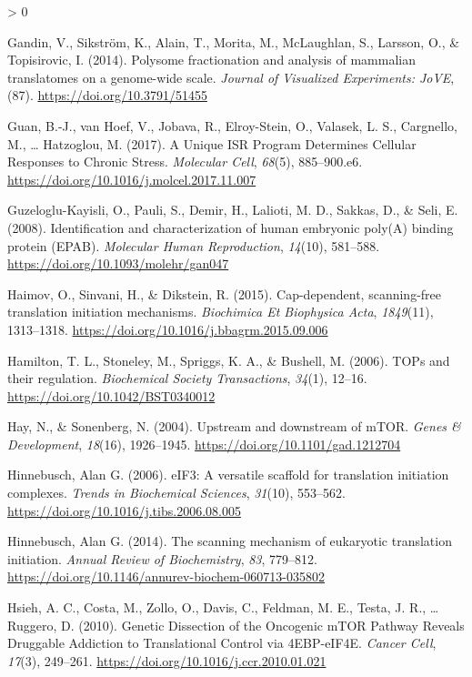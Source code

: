 \documentclass[
  12pt,
  openany]{book}
\newlength{\cslhangindent}
\newenvironment{CSLReferences}[2] %
 {%
  \setlength{\parindent}{0pt}
  \ifodd #1 \everypar{\setlength{\hangindent}{\cslhangindent}}\ignorespaces\fi
  \ifnum #2 > 0
  \setlength{\parskip}{#2\baselineskip}
  \fi
 }%
 {}
\begin{document}
\begin{CSLReferences}{1}{0}
\leavevmode\hypertarget{ref-Gandin2014}{}%
Gandin, V., Sikström, K., Alain, T., Morita, M., McLaughlan, S., Larsson, O., \& Topisirovic, I. (2014). Polysome fractionation and analysis of mammalian translatomes on a genome-wide scale. \emph{Journal of Visualized Experiments: JoVE}, (87). \url{https://doi.org/10.3791/51455}

\leavevmode\hypertarget{ref-Guan2017}{}%
Guan, B.-J., van Hoef, V., Jobava, R., Elroy-Stein, O., Valasek, L. S., Cargnello, M., \ldots{} Hatzoglou, M. (2017). A {Unique ISR Program Determines Cellular Responses} to {Chronic Stress}. \emph{Molecular Cell}, \emph{68}(5), 885--900.e6. \url{https://doi.org/10.1016/j.molcel.2017.11.007}

\leavevmode\hypertarget{ref-Guzeloglu-Kayisli2008}{}%
Guzeloglu-Kayisli, O., Pauli, S., Demir, H., Lalioti, M. D., Sakkas, D., \& Seli, E. (2008). Identification and characterization of human embryonic poly({A}) binding protein ({EPAB}). \emph{Molecular Human Reproduction}, \emph{14}(10), 581--588. \url{https://doi.org/10.1093/molehr/gan047}

\leavevmode\hypertarget{ref-Haimov2015}{}%
Haimov, O., Sinvani, H., \& Dikstein, R. (2015). Cap-dependent, scanning-free translation initiation mechanisms. \emph{Biochimica Et Biophysica Acta}, \emph{1849}(11), 1313--1318. \url{https://doi.org/10.1016/j.bbagrm.2015.09.006}

\leavevmode\hypertarget{ref-Hamilton2006}{}%
Hamilton, T. L., Stoneley, M., Spriggs, K. A., \& Bushell, M. (2006). {TOPs} and their regulation. \emph{Biochemical Society Transactions}, \emph{34}(1), 12--16. \url{https://doi.org/10.1042/BST0340012}

\leavevmode\hypertarget{ref-Hay2004}{}%
Hay, N., \& Sonenberg, N. (2004). Upstream and downstream of {mTOR}. \emph{Genes \& Development}, \emph{18}(16), 1926--1945. \url{https://doi.org/10.1101/gad.1212704}

\leavevmode\hypertarget{ref-Hinnebusch2006}{}%
Hinnebusch, Alan G. (2006). {eIF3}: A versatile scaffold for translation initiation complexes. \emph{Trends in Biochemical Sciences}, \emph{31}(10), 553--562. \url{https://doi.org/10.1016/j.tibs.2006.08.005}

\leavevmode\hypertarget{ref-Hinnebusch2014}{}%
Hinnebusch, Alan G. (2014). The scanning mechanism of eukaryotic translation initiation. \emph{Annual Review of Biochemistry}, \emph{83}, 779--812. \url{https://doi.org/10.1146/annurev-biochem-060713-035802}

\leavevmode\hypertarget{ref-Hsieh2010}{}%
Hsieh, A. C., Costa, M., Zollo, O., Davis, C., Feldman, M. E., Testa, J. R., \ldots{} Ruggero, D. (2010). Genetic {Dissection} of the {Oncogenic mTOR Pathway Reveals Druggable Addiction} to {Translational Control} via {4EBP}-{eIF4E}. \emph{Cancer Cell}, \emph{17}(3), 249--261. \url{https://doi.org/10.1016/j.ccr.2010.01.021}


\end{CSLReferences}
\end{document}
